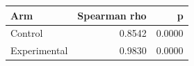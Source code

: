 \begin{tabular}{lrr}
\toprule
Arm & Spearman rho & p \\
\midrule
Control & 0.8542 & 0.0000 \\
Experimental & 0.9830 & 0.0000 \\
\bottomrule
\end{tabular}
